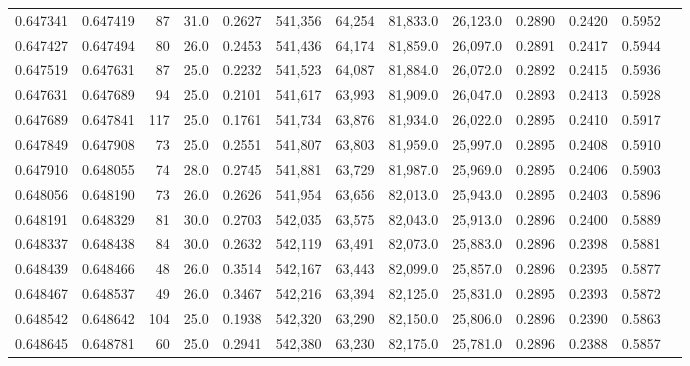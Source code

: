 \begin{tabular}{rrrrrrrrrrrrr}
0.647341 & 0.647419 &    87 & 31.0 &                                     0.2627 & 541,356 &  64,254 &  81,833.0 &  26,123.0 & 0.2890 & 0.2420 & 0.5952 \\
0.647427 & 0.647494 &    80 & 26.0 &                                     0.2453 & 541,436 &  64,174 &  81,859.0 &  26,097.0 & 0.2891 & 0.2417 & 0.5944 \\
0.647519 & 0.647631 &    87 & 25.0 &                                     0.2232 & 541,523 &  64,087 &  81,884.0 &  26,072.0 & 0.2892 & 0.2415 & 0.5936 \\
0.647631 & 0.647689 &    94 & 25.0 &                                     0.2101 & 541,617 &  63,993 &  81,909.0 &  26,047.0 & 0.2893 & 0.2413 & 0.5928 \\
0.647689 & 0.647841 &   117 & 25.0 &                                     0.1761 & 541,734 &  63,876 &  81,934.0 &  26,022.0 & 0.2895 & 0.2410 & 0.5917 \\
0.647849 & 0.647908 &    73 & 25.0 &                                     0.2551 & 541,807 &  63,803 &  81,959.0 &  25,997.0 & 0.2895 & 0.2408 & 0.5910 \\
0.647910 & 0.648055 &    74 & 28.0 &                                     0.2745 & 541,881 &  63,729 &  81,987.0 &  25,969.0 & 0.2895 & 0.2406 & 0.5903 \\
0.648056 & 0.648190 &    73 & 26.0 &                                     0.2626 & 541,954 &  63,656 &  82,013.0 &  25,943.0 & 0.2895 & 0.2403 & 0.5896 \\
0.648191 & 0.648329 &    81 & 30.0 &                                     0.2703 & 542,035 &  63,575 &  82,043.0 &  25,913.0 & 0.2896 & 0.2400 & 0.5889 \\
0.648337 & 0.648438 &    84 & 30.0 &                                     0.2632 & 542,119 &  63,491 &  82,073.0 &  25,883.0 & 0.2896 & 0.2398 & 0.5881 \\
0.648439 & 0.648466 &    48 & 26.0 &                                     0.3514 & 542,167 &  63,443 &  82,099.0 &  25,857.0 & 0.2896 & 0.2395 & 0.5877 \\
0.648467 & 0.648537 &    49 & 26.0 &                                     0.3467 & 542,216 &  63,394 &  82,125.0 &  25,831.0 & 0.2895 & 0.2393 & 0.5872 \\
0.648542 & 0.648642 &   104 & 25.0 &                                     0.1938 & 542,320 &  63,290 &  82,150.0 &  25,806.0 & 0.2896 & 0.2390 & 0.5863 \\
0.648645 & 0.648781 &    60 & 25.0 &                                     0.2941 & 542,380 &  63,230 &  82,175.0 &  25,781.0 & 0.2896 & 0.2388 & 0.5857 \\

\end{tabular}
